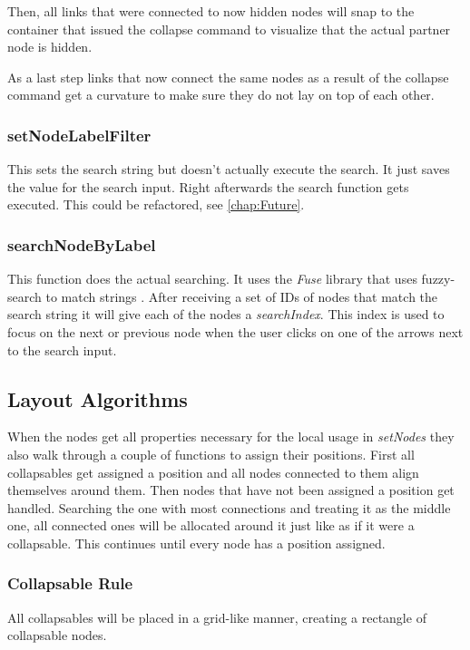 Then, all links that were connected to now hidden nodes will snap to the container that issued the collapse command to visualize that the actual partner node is hidden.

As a last step links that now connect the same nodes as a result of the collapse command get a curvature to make sure they do not lay on top of each other.

\subsubsection{setNodeLabelFilter}
This sets the search string but doesn't actually execute the search. It just saves the value for the search input. Right afterwards the search function gets executed. This could be refactored, see \autoref{chap:Future}.

\subsubsection{searchNodeByLabel}
This function does the actual searching. It uses the \emph{Fuse} library that uses fuzzy-search to match strings \cite{Fuze}. After receiving a set of IDs of nodes that match the search string it will give each of the nodes a \emph{searchIndex}. This index is used to focus on the next or previous node when the user clicks on one of the arrows next to the search input.


\subsection{Layout Algorithms}
When the nodes get all properties necessary for the local usage in \emph{setNodes} they also walk through a couple of functions to assign their positions. First all collapsables get assigned a position and all nodes connected to them align themselves around them. Then nodes that have not been assigned a position get handled. Searching the one with most connections and treating it as the middle one, all connected ones will be allocated around it just like as if it were a collapsable. This continues until every node has a position assigned.

\newpage
\subsubsection{Collapsable Rule}
All collapsables will be placed in a grid-like manner, creating a rectangle of collapsable nodes.

